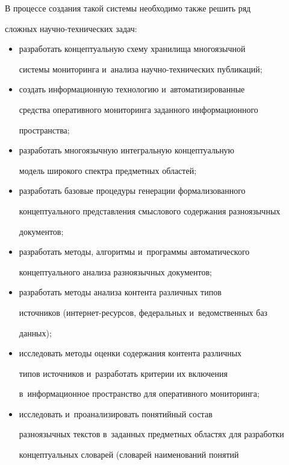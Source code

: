      


     В процессе создания такой системы необходимо также решить ряд 


сложных на\-уч\-но-технических задач:


     \begin{itemize}


\item разработать концептуальную схему хранилища многоязычной 


системы мониторинга и~анализа научно-технических публикаций;


\item создать информационную технологию и~автоматизированные 


средства оперативного мониторинга заданного информационного 


пространства;


\item разработать многоязычную интегральную концептуальную 


модель широкого спектра предметных областей;


\item разработать базовые процедуры генерации формализованного 


концептуального представления смыслового содержания разноязычных 


документов;


\item разработать методы, алгоритмы и~программы автоматического 


концептуального анализа разноязычных документов;


\item разработать методы анализа контента различных типов 


источников (интер\-нет-ре\-сур\-сов, федеральных и~ведомственных баз 


данных);


\item исследовать методы оценки содержания контента различных 


типов источников и~разработать критерии их включения 


в~информационное пространство для оперативного мониторинга; 


\item исследовать и~проанализировать понятийный состав 


разноязычных текстов в~заданных предметных областях для разработки 


концептуальных словарей (словарей наименований понятий 



\end{itemize}
